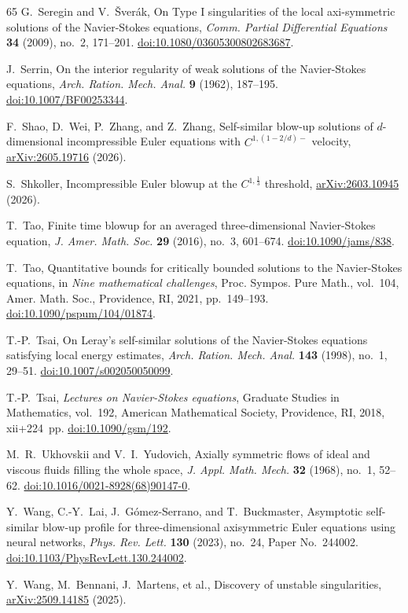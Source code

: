 \documentclass[11pt,reqno]{amsproc}
\numberwithin{equation}{section}
\theoremstyle{remark}
\begin{document}
\begin{thebibliography}{65}
G.~Seregin and V.~\v{S}ver\'ak,
On Type I singularities of the local axi-symmetric solutions of the
Navier-Stokes equations,
\emph{Comm. Partial Differential Equations} \textbf{34} (2009), no.~2, 171--201.
\href{https://doi.org/10.1080/03605300802683687}{doi:10.1080/03605300802683687}.

J.~Serrin,
On the interior regularity of weak solutions of the Navier-Stokes equations,
\emph{Arch. Ration. Mech. Anal.} \textbf{9} (1962), 187--195.
\href{https://doi.org/10.1007/BF00253344}{doi:10.1007/BF00253344}.

F.~Shao, D.~Wei, P.~Zhang, and Z.~Zhang,
Self-similar blow-up solutions of $d$-dimensional incompressible Euler equations with $C^{1,(1-2/d)-}$ velocity,
\href{https://arxiv.org/abs/2605.19716}{arXiv:2605.19716} (2026).

S.~Shkoller,
Incompressible Euler blowup at the $C^{1,\frac{1}{3}}$ threshold,
\href{https://arxiv.org/abs/2603.10945}{arXiv:2603.10945} (2026).

T.~Tao,
Finite time blowup for an averaged three-dimensional Navier-Stokes equation,
\emph{J. Amer. Math. Soc.} \textbf{29} (2016), no.~3, 601--674.
\href{https://doi.org/10.1090/jams/838}{doi:10.1090/jams/838}.

T.~Tao,
Quantitative bounds for critically bounded solutions to the Navier-Stokes
equations,
in \emph{Nine mathematical challenges}, Proc. Sympos. Pure Math., vol.~104,
Amer. Math. Soc., Providence, RI, 2021, pp.~149--193.
\href{https://doi.org/10.1090/pspum/104/01874}{doi:10.1090/pspum/104/01874}.

T.-P.~Tsai,
On Leray's self-similar solutions of the Navier-Stokes equations satisfying
local energy estimates,
\emph{Arch. Ration. Mech. Anal.} \textbf{143} (1998), no.~1, 29--51.
\href{https://doi.org/10.1007/s002050050099}{doi:10.1007/s002050050099}.

T.-P.~Tsai, \emph{Lectures on Navier-Stokes equations},
Graduate Studies in Mathematics, vol.~192, American Mathematical Society, Providence, RI, 2018, xii+224~pp.
\href{https://doi.org/10.1090/gsm/192}{doi:10.1090/gsm/192}.

M.~R.~Ukhovskii and V.~I.~Yudovich,
Axially symmetric flows of ideal and viscous fluids filling the whole space,
\emph{J. Appl. Math. Mech.} \textbf{32} (1968), no.~1, 52--62.
\href{https://doi.org/10.1016/0021-8928(68)90147-0}{doi:10.1016/0021-8928(68)90147-0}.

Y.~Wang, C.-Y.~Lai, J.~G\'omez-Serrano, and T.~Buckmaster,
Asymptotic self-similar blow-up profile for three-dimensional axisymmetric Euler equations using neural networks,
\emph{Phys. Rev. Lett.} \textbf{130} (2023), no.~24, Paper No.~244002.
\href{https://doi.org/10.1103/PhysRevLett.130.244002}{doi:10.1103/PhysRevLett.130.244002}.

Y.~Wang, M.~Bennani, J.~Martens, et al.,
Discovery of unstable singularities,
\href{https://arxiv.org/abs/2509.14185}{arXiv:2509.14185} (2025).

\end{thebibliography}
\end{document}

